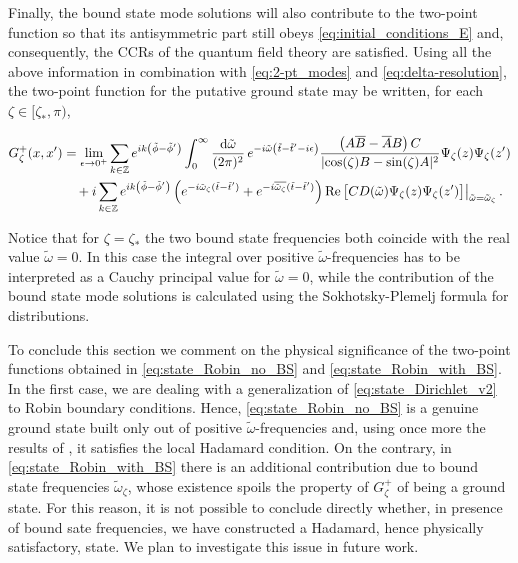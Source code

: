 \documentclass[aps, prd, amsmath, floats, floatfix, twocolumn, nofootinbib, superscriptaddress, showpacs]{revtex4-1}
\begin{document}
Finally, the bound state mode solutions will also contribute to the two-point function so that its antisymmetric part still obeys \eqref{eq:initial_conditions_E} and, consequently, the CCRs of the quantum field theory are satisfied. Using all the above information in combination with \eqref{eq:2-pt_modes} and \eqref{eq:delta-resolution}, the two-point function for the putative ground state may be written, for each $\zeta\in[\zeta_*,\pi)$,
%
\begin{widetext}
\begin{align}
G^+_\zeta(x,x^\prime) &= \lim_{\epsilon \to 0^+} \sum_{k\in\mathbb{Z}} e^{ik\left(\tilde{\phi}-\tilde{\phi}^\prime\right)} \int_0^{\infty} \frac{\dd\tilde{\omega}}{(2\pi)^2} \, e^{-i\tilde{\omega} \left(\tilde{t}-\tilde{t}^\prime-i\epsilon\right)} \frac{\left(A\overline{B}-\overline{A}B\right) C}{|{\cos(\zeta) B-\sin(\zeta)A}|^2} \Psi_{\zeta}(z)\Psi_{\zeta}(z') \notag 
\\
&\quad + i \sum_{k\in\mathbb{Z}} e^{ik\left(\tilde{\phi}-\tilde{\phi}^\prime\right)} \left(e^{-i\tilde{\omega}_{\zeta}(\tilde{t}-\tilde{t}^\prime)} + e^{-i\overline{\tilde{\omega}_{\zeta}}(\tilde{t}-\tilde{t}^\prime)}\right) \Re\big[ C D(\tilde{\omega})\Psi_{\zeta}(z)\Psi_{\zeta}(z^\prime)\big]\big|_{\tilde{\omega} = \tilde{\omega}_\zeta} \, . \label{eq:state_Robin_with_BS}
\end{align}
\end{widetext}
%

Notice that for $\zeta=\zeta_*$ the two bound state frequencies both coincide with the real value $\tilde{\omega} =0$. In this case the integral over positive $\tilde{\omega}$-frequencies has to be interpreted as a Cauchy principal value for $\tilde{\omega}=0$, while the contribution of the bound state mode solutions is calculated using the Sokhotsky-Plemelj formula for distributions.

To conclude this section we comment on the physical significance of the two-point functions obtained in \eqref{eq:state_Robin_no_BS} and \eqref{eq:state_Robin_with_BS}. In the first case, we are dealing with a generalization of \eqref{eq:state_Dirichlet_v2} to Robin boundary conditions. Hence, \eqref{eq:state_Robin_no_BS} is a genuine ground state built only out of positive $\tilde{\omega}$-frequencies and, using once more the results of \cite{Sahlmann:2000fh}, it satisfies the local Hadamard condition. On the contrary, in \eqref{eq:state_Robin_with_BS} there is an additional contribution due to bound state frequencies $\tilde{\omega}_\zeta$, whose existence spoils the property of $G^+_\zeta$ of being a ground state. For this reason, it is not possible to conclude directly whether, in presence of bound sate frequencies, we have constructed a Hadamard, hence physically satisfactory, state. We plan to investigate this issue in future work. 
	
\end{document}
